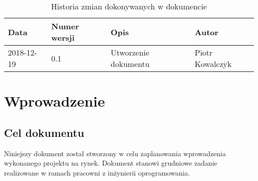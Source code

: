 \documentclass{article}
\begin{document}
\begin{titlepage}






\end{titlepage}

\addtocounter{page}{1}
\newpage

\begin{table}[h!]
 \begin{center}
	\caption{Historia zmian dokonywanych w dokumencie}
   \begin{tabular}{|l|l|l|l|}
		\hline
		Data & Numer wersji & Opis & Autor \\
		\hline \hline
		2018-12-19 & 0.1 & Utworzenie dokumentu & Piotr Kowalczyk \\
		\hline
  \end{tabular}
 \end{center}
\end{table}	


\tableofcontents

\newpage


\section{Wprowadzenie}
\subsection{Cel dokumentu}
Niniejszy dokument został stworzony w celu zaplanowania wprowadzenia wykonanego projektu na rynek.
Dokument stanowi grudniowe zadanie realizowane w ramach pracowni z inżynierii oprogramowania.
\end{document}

